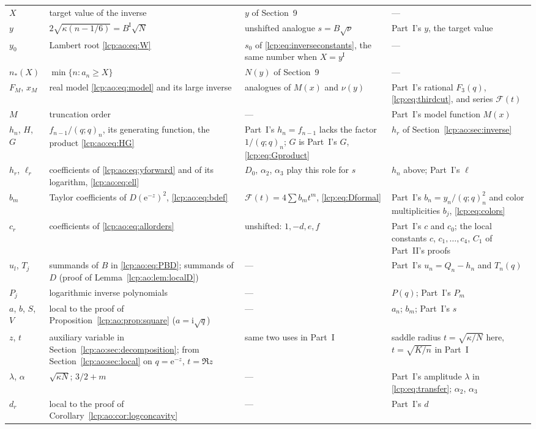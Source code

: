 \documentclass[11pt]{article}
\numberwithin{equation}{section}
\theoremstyle{definition}\newtheorem{definition}[theorem]{Definition}
\theoremstyle{remark}\newtheorem{remark}[theorem]{Remark}
\newcommand{\ee}{\mathrm e}
\newcommand{\ii}{\mathrm i}%
\begin{document}
{\begin{longtable}{@{}>{\raggedright}p{}>{\raggedright}p{}>{\raggedright}p{}>{\raggedright\arraybackslash}p{}@{}}
$X$ & target value of the inverse & $y$ of Section~9 & ---\\
$y$ & $2\sqrt{\kappa(n-1/6)}=B^{\mathrm I}\sqrt N$ & unshifted analogue $s=B\sqrt\nu$ & Part~I's $y$, the target value\\
$y_0$ & Lambert root \eqref{lcp:ao:eq:W} & $s_0$ of \eqref{lcp:eq:inverseconstants}, the same number when $X=y^{\mathrm I}$ & ---\\
$n_*(X)$ & $\min\{n:a_n\ge X\}$ & $N(y)$ of Section~9 & ---\\
$F_M$, $x_M$ & real model \eqref{lcp:ao:eq:model} and its large inverse & analogues of $M(x)$ and $\nu(y)$ & Part~I's rational $F_3(q)$, \eqref{lcp:eq:thirdcut}, and series $\mathcal F(t)$\\
$M$ & truncation order & --- & Part~I's model function $M(x)$\\
$h_n$, $H$, $G$ & $f_{n-1}/(q;q)_n$, its generating function, the product \eqref{lcp:ao:eq:HG} & Part~I's $h_n=f_{n-1}$ lacks the factor $1/(q;q)_n$; $G$ is Part~I's $G$, \eqref{lcp:eq:Gproduct} & $h_r$ of Section~\ref{lcp:ao:sec:inverse}\\
$h_r$, $\ell_r$ & coefficients of \eqref{lcp:ao:eq:yforward} and of its logarithm, \eqref{lcp:ao:eq:ell} & $D_0$, $\alpha_2$, $\alpha_3$ play this role for $s$ & $h_n$ above; Part~I's $\ell$\\
$b_m$ & Taylor coefficients of $D(\ee^{-z})^2$, \eqref{lcp:ao:eq:bdef} & $\mathcal F(t)=4\sum b_mt^m$, \eqref{lcp:eq:Dformal} & Part~I's $b_n=y_n/(q;q)_n^2$ and color multiplicities $b_j$, \eqref{lcp:eq:colors}\\
$c_r$ & coefficients of \eqref{lcp:ao:eq:allorders} & unshifted: $1,-d,e,f$ & Part~I's $c$ and $c_0$; the local constants $c$, $c_1,\ldots,c_4$, $C_1$ of Part~II's proofs\\
$u_l$, $T_j$ & summands of $B$ in \eqref{lcp:ao:eq:PBD}; summands of $D$ (proof of Lemma~\ref{lcp:ao:lem:localD}) & --- & Part~I's $u_n=Q_n-h_n$ and $T_n(q)$\\
$P_j$ & logarithmic inverse polynomials & --- & $P(q)$; Part~I's $P_m$\\
$a$, $b$, $S$, $V$ & local to the proof of Proposition~\ref{lcp:ao:prop:square} ($a=\ii\sqrt q$) & --- & $a_n$; $b_m$; Part~I's $s$\\
$z$, $t$ & auxiliary variable in Section~\ref{lcp:ao:sec:decomposition}; from Section~\ref{lcp:ao:sec:local} on $q=\ee^{-z}$, $t=\Re z$ & same two uses in Part~I & saddle radius $t=\sqrt{\kappa/N}$ here, $t=\sqrt{K/n}$ in Part~I\\
$\lambda$, $\alpha$ & $\sqrt{\kappa N}$; $3/2+m$ & --- & Part~I's amplitude $\lambda$ in \eqref{lcp:eq:transfer}; $\alpha_2$, $\alpha_3$\\
$d_r$ & local to the proof of Corollary~\ref{lcp:ao:cor:logconcavity} & --- & Part~I's $d$\\
\end{longtable}}
\end{document}
